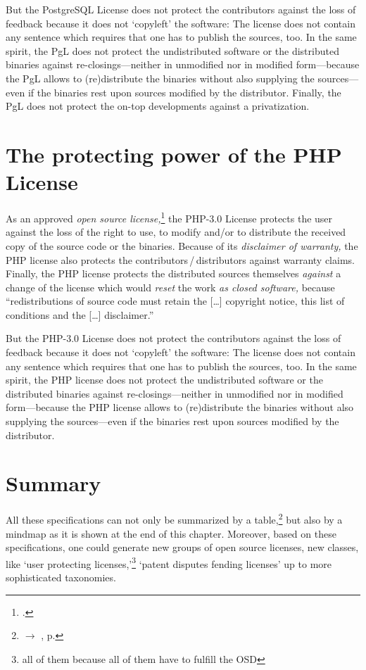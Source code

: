 But the PostgreSQL License does not protect the contributors against the loss of
feedback because it does not `copyleft' the software: The license does not
contain any sentence which requires that one has to publish the sources, too. 
In the same spirit, the PgL does not protect the undistributed software or the
distributed binaries against re-closings---neither in unmodified nor in
modified form---because the PgL allows to (re)distribute the binaries without
also supplying the sources---even if the binaries rest upon sources modified by
the distributor. Finally, the PgL does not protect the on-top developments
against a privatization.


\section{\texorpdfstring{The protecting power of the}{The} PHP License}

As an approved \emph{open source license,}\footcite[cf.][\nopage wp]{OSI2012b}
the PHP-3.0 License protects the user against the loss of the right to use, to
modify and/or to distribute the received copy of the source code or the
binaries.\citePHP{} Because of its \emph{disclaimer of warranty,} the PHP
license also protects the contributors\,/\,distributors against warranty
claims.\citePHP{}  Finally, the PHP license protects the distributed
sources themselves \emph{against} a change of the license which would
\emph{reset} the work \emph{as closed software,} because
\enquote{redistributions of source code must retain the [\ldots] copyright
notice, this list of conditions and the [\ldots] disclaimer.}\citePHP{}

But the PHP-3.0 License does not protect the contributors against the loss of
feedback because it does not `copyleft' the software: The license does not
contain any sentence which requires that one has to publish the sources, too. 
In the same spirit, the PHP license does not protect the undistributed software
or the distributed binaries against re-closings---neither in unmodified nor in
modified form---because the PHP license allows to (re)distribute the binaries
without also supplying the sources---even if the binaries rest upon sources
modified by the distributor.
  
\section{Summary}

All these specifications can not only be summarized by a
table,\footnote{$\rightarrow$ \oslic{}, p. \pageref{tab:powerOfLicenses}} but also
by a mindmap as it is shown at the end of this chapter. Moreover, based on these
specifications, one could generate new groups of open source licenses, new
classes, like `user protecting licenses,'\footnote{all of them because all of
them have to fulfill the OSD} `patent disputes fending licenses' up to more
sophisticated taxonomies.

